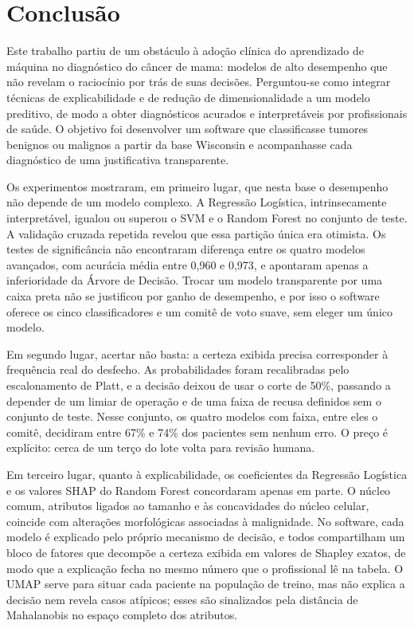 \documentclass[
    12pt
    ,oneside
    ,a4paper
    ,chapter=TITLE
    ,section=TITLE
    ,sumario=abnt-6027-2012
    ,english,brazil]{abntex2} %
\begin{document}
\chapter{Conclusão}
\label{cap:consideracoes-finais}

Este trabalho partiu de um obstáculo à adoção clínica do aprendizado de máquina no diagnóstico do câncer de mama: modelos de alto desempenho que não revelam o raciocínio por trás de suas decisões. Perguntou-se como integrar técnicas de explicabilidade e de redução de dimensionalidade a um modelo preditivo, de modo a obter diagnósticos acurados e interpretáveis por profissionais de saúde. O objetivo foi desenvolver um software que classificasse tumores benignos ou malignos a partir da base Wisconsin e acompanhasse cada diagnóstico de uma justificativa transparente.

Os experimentos mostraram, em primeiro lugar, que nesta base o desempenho não depende de um modelo complexo. A Regressão Logística, intrinsecamente interpretável, igualou ou superou o SVM e o Random Forest no conjunto de teste. A validação cruzada repetida revelou que essa partição única era otimista. Os testes de significância não encontraram diferença entre os quatro modelos avançados, com acurácia média entre 0,960 e 0,973,  e apontaram apenas a inferioridade da Árvore de Decisão. Trocar um modelo transparente por uma caixa preta não se justificou por ganho de desempenho, e por isso o software oferece os cinco classificadores e um comitê de voto suave, sem eleger um único modelo.

Em segundo lugar, acertar não basta: a certeza exibida precisa corresponder à frequência real do desfecho. As probabilidades foram recalibradas pelo escalonamento de Platt, e a decisão deixou de usar o corte de 50\%, passando a depender de um limiar de operação e de uma faixa de recusa definidos sem o conjunto de teste. Nesse conjunto, os quatro modelos com faixa, entre eles o comitê, decidiram entre 67\% e 74\% dos pacientes sem nenhum erro. O preço é explícito: cerca de um terço do lote volta para revisão humana.

Em terceiro lugar, quanto à explicabilidade, os coeficientes da Regressão Logística e os valores SHAP do Random Forest concordaram apenas em parte. O núcleo comum, atributos ligados ao tamanho e às concavidades do núcleo celular, coincide com alterações morfológicas associadas à malignidade. No software, cada modelo é explicado pelo próprio mecanismo de decisão, e todos compartilham um bloco de fatores que decompõe a certeza exibida em valores de Shapley exatos, de modo que a explicação fecha no mesmo número que o profissional lê na tabela. O UMAP serve para situar cada paciente na população de treino, mas não explica a decisão nem revela casos atípicos; esses são sinalizados pela distância de Mahalanobis no espaço completo dos atributos.
\end{document}
